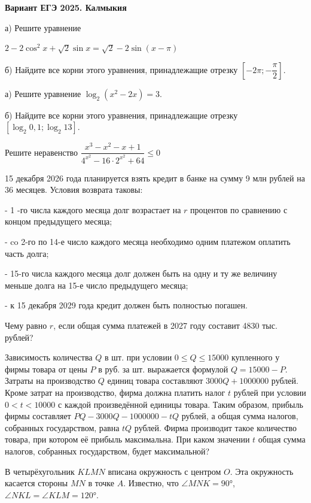 \centerline{\bf \Huge Вариант ЕГЭ 2025. Калмыкия}
\centerline{\bf \Huge }

 а) Решите уравнение

$2 - 2 \cos^2{x} + \sqrt{2} \sin{x} = \sqrt{2} - 2\sin{(x-\pi)}$

б) Найдите все корни этого уравнения, принадлежащие отрезку $[-2\pi;-\dfrac{\pi}{2}]$.

 а) Решите уравнение $\log _2\left(x^2-2 x\right)=3$.

б) Найдите все корни этого уравнения, принадлежащие отрезку $\left[\log _2 0,1; \log _2 13\right]$.

 Решите неравенство $\dfrac{x^3-x^2-x+1}{4^{x^2}-16\cdot2^{x^2}+64}\leqslant 0$

 15 декабря 2026 года планируется взять кредит в банке на сумму 9 млн рублей на 36 месяцев. Условия возврата таковы:

- 1 -го числа каждого месяца долг возрастает на $r$ процентов по сравнению с концом предыдущего месяца;

- co 2-го по 14-е число каждого месяца необходимо одним платежом оплатить часть долга;

- 15-го числа каждого месяца долг должен быть на одну и ту же величину меньше долга на 15-е число предыдущего месяца;

- к 15 декабря 2029 года кредит должен быть полностью погашен.

Чему равно $r$, если общая сумма платежей в 2027 году составит 4830 тыс. рублей?

 Зависимость количества $Q$ в шт. при условии $0 \leqslant Q \leqslant 15000$ купленного у фирмы товара от цены $P$ в руб. за шт. выражается формулой $Q=15000-P$. Затраты на производство $Q$ единиц товара составляют $3000 Q+1000000$ рублей. Кроме затрат на производство, фирма должна платить налог $t$ рублей при условии $0<t<10000$ с каждой произведённой единицы товара. Таким образом, прибыль фирмы составляет $P Q-3000 Q-1000000-t Q$ рублей, а общая сумма налогов, собранных государством, равна $t Q$ рублей.
Фирма производит такое количество товара, при котором её прибыль максимальна. При каком значении $t$ общая сумма налогов, собранных государством, будет максимальной?

\newpage
\hspace{3mm}

 В четырёхугольник $KLMN$ вписана окружность с центром $O$. Эта окружность касается стороны $MN$ в точке $A$. Известно, что $\angle MNK=90°$,  $\angle NKL=\angle KLM=120°$.

